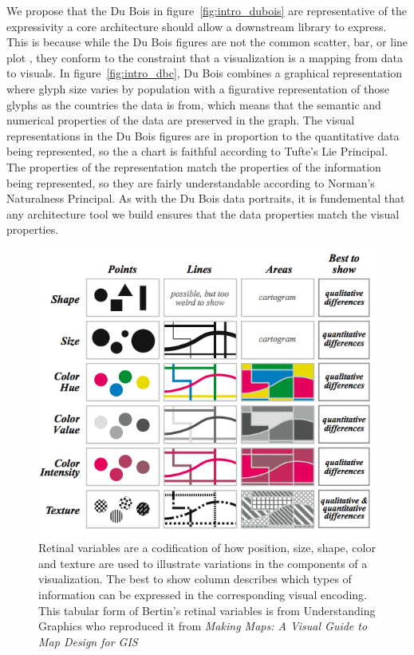 \documentclass[../main.tex]{subfiles}
\begin{document}
We propose that the Du Bois in figure~\ref{fig:intro_dubois} are representative of the expressivity a core architecture should allow a downstream library to express. This is because while the Du Bois figures are not the common scatter, bar, or line plot \cite{friendlyBriefHistoryData2008}, they conform to the constraint that a visualization is a mapping from data to visuals. In figure~\ref{fig:intro_dbc}, Du Bois combines a graphical representation where glyph size varies by population with a figurative representation of those glyphs as the countries the data is from, which means that the semantic and numerical properties of the data are preserved in the graph. The visual representations in the Du Bois figures are in proportion to the quantitative data being represented, so the a chart is faithful according to Tufte's Lie Principal\cite{tufteVisualDisplayQuantitative2001}. The properties of the representation match the properties of the information being represented, so they are fairly understandable according to Norman's Naturalness Principal\cite{norman_things_smart}. As with the Du Bois data portraits, it is fundemental that any architecture tool we build ensures that the data properties match the visual properties. 


\begin{figure}[H]
\includegraphics[width=1\textwidth]{figures/intro/retinal_variables.png}
\caption{Retinal variables are a codification of how position, size, shape, color and texture are used to illustrate variations in the components of a visualization. The best to show column describes which types of information can be expressed in the corresponding visual encoding. This tabular form of Bertin's retinal variables is from Understanding Graphics \cite{malamedInformationDisplayTips2010} who reproduced it from \textit{Making Maps: A Visual Guide to Map Design for GIS} 
\cite{krygierMakingMapsVisual2005}}
\label{fig:intro_retinal_variables}
\end{figure}
\end{document}
